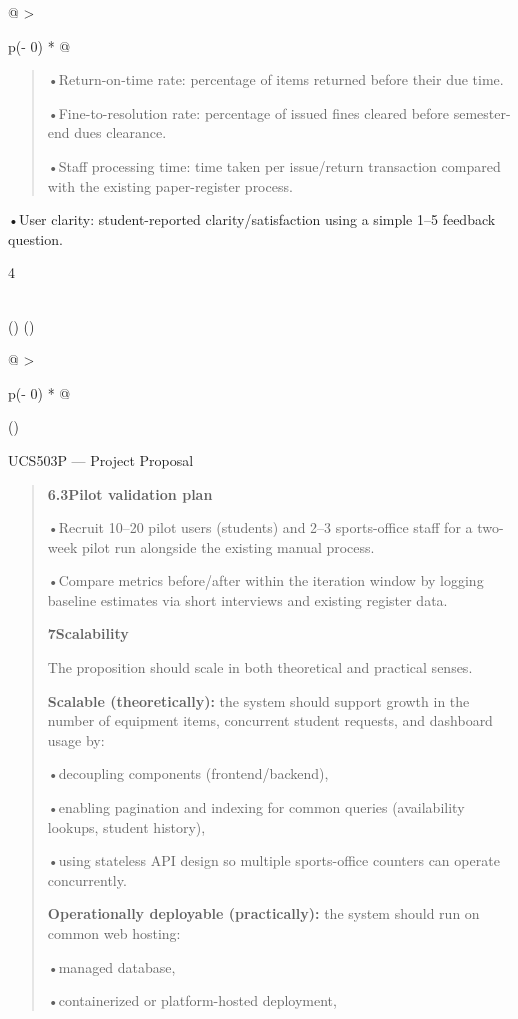 \documentclass[
]{article}
\begin{document}
\begin{longtable}[]{@{}
  >{\raggedright\arraybackslash}p{(\columnwidth - 0\tabcolsep) * }@{}}
\begin{minipage}[b]{\linewidth}
\begin{quote}
•Return-on-time rate: percentage of items returned before their due
time.

•Fine-to-resolution rate: percentage of issued fines cleared before
semester-end dues clearance.

•Staff processing time: time taken per issue/return transaction compared
with the existing paper-register process.
\end{quote}

•User clarity: student-reported clarity/satisfaction using a simple 1--5
feedback question.

4
\end{minipage} \\
\midrule()
\endhead
\bottomrule()
\end{longtable}

\begin{longtable}[]{@{}
  >{\raggedright\arraybackslash}p{(\columnwidth - 0\tabcolsep) * }@{}}
\toprule()
\begin{minipage}[b]{\linewidth}\raggedright
UCS503P --- Project Proposal

\begin{quote}
\textbf{6.3Pilot validation plan}

•Recruit 10--20 pilot users (students) and 2--3 sports-office staff for
a two-week pilot run alongside the existing manual process.

•Compare metrics before/after within the iteration window by logging
baseline estimates via short interviews and existing register data.

\textbf{7Scalability}

The proposition should scale in both theoretical and practical senses.

\textbf{Scalable (theoretically):} the system should support growth in
the number of equipment items, concurrent student requests, and
dashboard usage by:

•decoupling components (frontend/backend),

•enabling pagination and indexing for common queries (availability
lookups, student history),

•using stateless API design so multiple sports-office counters can
operate concurrently.

\textbf{Operationally deployable (practically):} the system should run
on common web hosting:

•managed database,

•containerized or platform-hosted deployment,


\end{quote}
\end{minipage}
\end{longtable}
\end{document}
